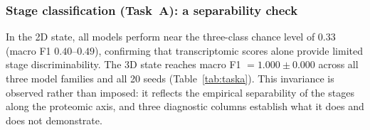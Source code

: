 \documentclass[5p,times,twocolumn]{elsarticle}
\newcommand{\rtag}[1]{}
\newcommand{\rev}[2]{\rtag{#1}#2}
\begin{document}
\subsubsection{\rev{R2.23}{Stage classification (Task~A): a
    separability check}}
\label{sec:res_taska}

In the 2D state, all models perform near the three-class chance
level of 0.33 (macro F1 $0.40$--$0.49$), confirming that
transcriptomic scores alone provide limited stage
discriminability.
The 3D state reaches macro F1 $= 1.000 \pm 0.000$ across all
three model families and all 20 seeds (Table~\ref{tab:taska}).
This invariance is observed rather than imposed: it reflects the
empirical separability of the stages along the proteomic axis,
and three diagnostic columns establish what it does and does not
demonstrate.
\end{document}
